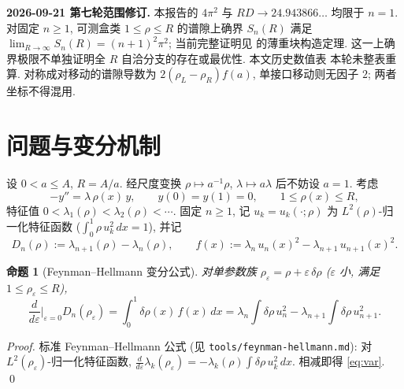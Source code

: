 \documentclass[UTF8]{ctexart}
\newtheorem{proposition}[theorem]{命题}
\begin{document}
\medskip
\noindent\textbf{2026-09-21 第七轮范围修订.} 本报告的 $4\pi^2$ 与
$R D\to24.943866\ldots$ 均限于 $n=1$. 对固定 $n\ge1$, 可测盒类
$1\le\rho\le R$ 的谱隙上确界 $S_n(R)$ 满足
$\lim_{R\to\infty}S_n(R)=(n+1)^2\pi^2$; 当前完整证明见
 的薄重块构造定理.
这一上确界极限不单独证明全 $R$ 自洽分支的存在或最优性. 本文历史数值表
本轮未整表重算. 对称成对移动的谱隙导数为
$2(\rho_L-\rho_R)f(a)$, 单接口移动则无因子 $2$; 两者坐标不得混用.

\tableofcontents

\section{问题与变分机制}\label{sec:mech}

设 $0 < a \leq A$, $R = A/a$. 经尺度变换 $\rho \mapsto a^{-1}\rho$,
$\lambda \mapsto a\lambda$ 后不妨设 $a = 1$. 考虑
\begin{equation}
	-y'' = \lambda\,\rho(x)\,y, \qquad y(0) = y(1) = 0,
	\qquad 1 \leq \rho(x) \leq R,
\end{equation}
特征值 $0 < \lambda_1(\rho) < \lambda_2(\rho) < \cdots$. 固定 $n \geq 1$,
记 $u_k = u_k(\cdot; \rho)$ 为 $L^2(\rho)$-归一化特征函数
($\int_0^1 \rho\, u_k^2\, dx = 1$), 并记
\[
	D_n(\rho) := \lambda_{n+1}(\rho) - \lambda_n(\rho),
	\qquad
	f(x) := \lambda_n\, u_n(x)^2 - \lambda_{n+1}\, u_{n+1}(x)^2.
\]

\begin{proposition}[Feynman--Hellmann 变分公式]\label{prop:fh}
	对单参数族 $\rho_\varepsilon = \rho + \varepsilon\,\delta\rho$ ($\varepsilon$
	小, 满足 $1 \leq \rho_\varepsilon \leq R$),
	\begin{equation}\label{eq:var}
		\frac{d}{d\varepsilon}\Big|_{\varepsilon=0} D_n(\rho_\varepsilon)
		= \int_0^1 \delta\rho(x)\, f(x)\, dx
		= \lambda_n\!\int\!\delta\rho\, u_n^2
		  - \lambda_{n+1}\!\int\!\delta\rho\, u_{n+1}^2.
	\end{equation}
\end{proposition}

\begin{proof}
	标准 Feynman--Hellmann 公式 (见 \texttt{tools/feynman-hellmann.md}):
	对 $L^2(\rho_\varepsilon)$-归一化特征函数,
	$\frac{d}{d\varepsilon}\lambda_k(\rho_\varepsilon) =
	-\lambda_k(\rho)\int \delta\rho\, u_k^2\, dx$. 相减即得
	\eqref{eq:var}. \qed
\end{proof}
\end{document}
